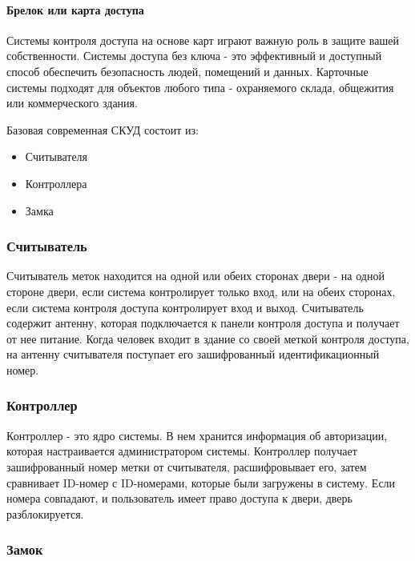 \paragraph{Брелок или карта доступа}

Системы контроля доступа на основе карт играют важную роль в защите вашей собственности. Системы доступа без ключа - это эффективный и доступный способ обеспечить безопасность людей, помещений и данных. Карточные системы подходят для объектов любого типа - охраняемого склада, общежития или коммерческого здания.

Базовая современная СКУД состоит из:

\begin{itemize}
	\item Считывателя
	\item Контроллера
	\item Замка
\end{itemize}

\subsubsection {Считыватель}

Считыватель меток находится на одной или обеих сторонах двери - на одной стороне двери, если система контролирует только вход, или на обеих сторонах, если система контроля доступа контролирует вход и выход. Считыватель содержит антенну, которая подключается к панели контроля доступа и получает от нее питание.
Когда человек входит в здание со своей меткой контроля доступа, на антенну считывателя поступает его зашифрованный идентификационный номер.

\subsubsection {Контроллер}

Контроллер - это ядро системы. В нем хранится информация об авторизации, которая настраивается администратором системы. Контроллер получает зашифрованный номер метки от считывателя, расшифровывает его, затем сравнивает ID-номер с ID-номерами, которые были загружены в систему. Если номера совпадают, и пользователь имеет право доступа к двери, дверь разблокируется.

\subsubsection {Замок}

